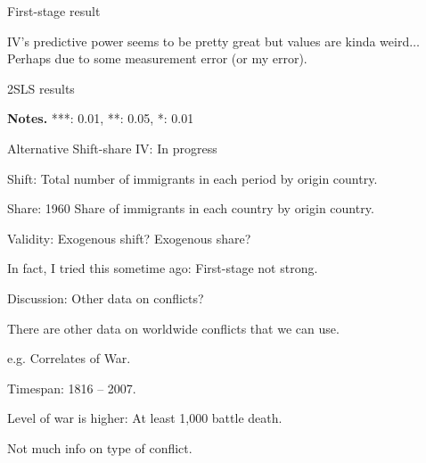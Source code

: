 \documentclass[notes,11pt, aspectratio=169]{beamer}
\newenvironment{wideitemize}{\itemize\addtolength{\itemsep}{10pt}}{\enditemize}
\begin{document}
\begin{frame}{First-stage result}
	\begin{figure}
	\end{figure}	
	IV's predictive power seems to be pretty great but values are kinda weird$\ldots$ Perhaps due to some measurement error (or my error).
\end{frame}

\begin{frame}{2SLS results}
\begin{table}
	\resizebox{0.8\textwidth}{!}{
	}
\end{table}	
\begin{footnotesize}
	\textbf{Notes.} ***: 0.01, **: 0.05, *: 0.01
\end{footnotesize}
\end{frame}

\begin{frame}{Alternative Shift-share IV: In progress}

	\begin{wideitemize}
	\item Shift: Total number of immigrants in each period by origin country.
	\item Share: 1960 Share of immigrants in each country by origin country.
	\item Validity: Exogenous shift? Exogenous share?
	\item In fact, I tried this sometime ago: First-stage not strong.
	\end{wideitemize}
	
\end{frame}

\begin{frame}{Discussion: Other data on conflicts?}
	\begin{wideitemize}
	\item There are other data on worldwide conflicts that we can use.
	\item e.g. Correlates of War.
	\item Timespan: 1816 – 2007.
	\item Level of war is higher: At least 1,000 battle death.
	\item Not much info on type of conflict.
	\end{wideitemize}
\end{frame}
\end{document}
